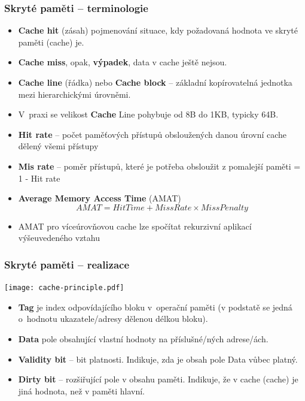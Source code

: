 \documentclass{beamer}
\begin{document}
\begin{frame}
\frametitle{Skryté paměti -- terminologie}

\begin{itemize}
\item \textbf{Cache hit} (zásah) pojmenování situace, kdy požadovaná hodnota ve skryté paměti (cache) je.
\item \textbf{Cache miss}, opak, \textbf{výpadek}, data v cache ještě nejsou.
\item \textbf{Cache line} (řádka) nebo \textbf{Cache block} – základní kopírovatelná jednotka mezi hierarchickými úrovněmi. 
\item V praxi se velikost \textbf{Cache} Line pohybuje od 8B do 1KB, typicky 64B.
\item \textbf{Hit rate} -- počet paměťových přístupů obsloužených danou úrovní cache dělený všemi přístupy
\item \textbf{Mis rate} -- poměr přístupů, které je potřeba obsloužit z pomalejší paměti = 1 - Hit rate
\item \textbf{Average Memory Access Time} (AMAT) $$AMAT = Hit Time + Miss Rate \times Miss Penalty$$
\item AMAT pro víceúrovňovou cache lze spočítat rekurzivní aplikací výšeuvedeného vztahu
\end{itemize}

\end{frame}

\begin{frame}
\frametitle{Skryté paměti -- realizace}
{
\centering

\texttt{[image: cache-principle.pdf]}

}
\vskip 2mm

\begin{itemize}
\item \textbf{Tag} je index odpovídajícího bloku v operační paměti (v podstatě se jedná o hodnotu ukazatele/adresy dělenou délkou bloku).
\item \textbf{Data} pole obsahující vlastní hodnoty na příslušné/ných adrese/ách.
\item \textbf{Validity bit} – bit platnosti. Indikuje, zda je obsah pole Data vůbec platný.  
\item \textbf{Dirty bit} – rozšiřující pole v obsahu paměti. Indikuje, že v cache (cache) je jiná hodnota, než v paměti hlavní.
\end{itemize}

\end{frame}
\end{document}
